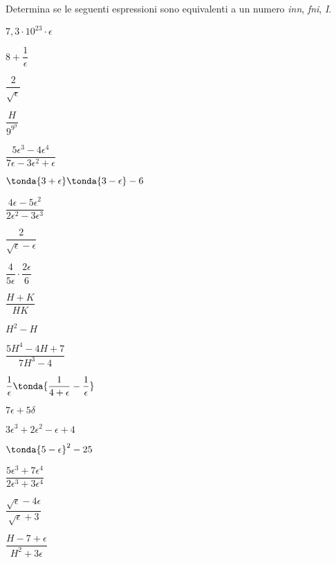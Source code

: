 \begin{esercizio}\label{ese:iper_op_01}
Determina se le seguenti espressioni sono equivalenti a un numero 
\emph{inn}, \emph{fni}, \emph{I}.
\begin{multicols}{3}
\begin{enumeratea}
 \item \(7,3 \cdot 10^23 \cdot \epsilon\)
 \item \(8 +\dfrac{1}{\epsilon}\)
 \item \(\dfrac{2}{\sqrt{\epsilon}}\) 
 \item \(\dfrac{H}{9^{9^9}}\) 
 \item \(\dfrac{5 \epsilon^3 -4 \epsilon^4}
               {7 \epsilon -3 \epsilon^2 +\epsilon}\)
 \item \(\tonda{3 +\epsilon} \tonda{3 -\epsilon} -6\) 
 \item \(\dfrac{4 \epsilon - 5 \epsilon^2}{2 \epsilon^2 -3 \epsilon^3}\) 
 \item \(\dfrac{2}{\sqrt{\epsilon} - \epsilon}\) 
 \item \(\dfrac{4}{5 \epsilon} \cdot \dfrac{2 \epsilon}{6}\) 
 \item \(\dfrac{H + K}{HK}\) 
 \item \(H^2 - H\)  
 \item \(\dfrac{5 H^4 -4 H +7} {7 H^3 -4}\)
 \item \(\dfrac{1}{\epsilon} \tonda{\dfrac{1} {4 + \epsilon} -
                                    \dfrac{1}{\epsilon}}\)
 \item \(7 \epsilon + 5 \delta\)
 \item \(3 \epsilon^3 +2 \epsilon^2 - \epsilon +4\)
 \item \(\tonda{5 - \epsilon}^2 - 25\)
 \item \(\dfrac{5 \epsilon^3 + 7  \epsilon^4}{2 \epsilon^3 + 3  \epsilon^4}\)
 \item \(\dfrac{\sqrt{\epsilon} -4 \epsilon}{\sqrt{\epsilon} + 3}\)
 \item \(\dfrac{H -7 +\epsilon}{H^2 + 3 \epsilon}\)
\end{enumeratea}
\end{multicols}
\end{esercizio}

\subsubsection*{}

